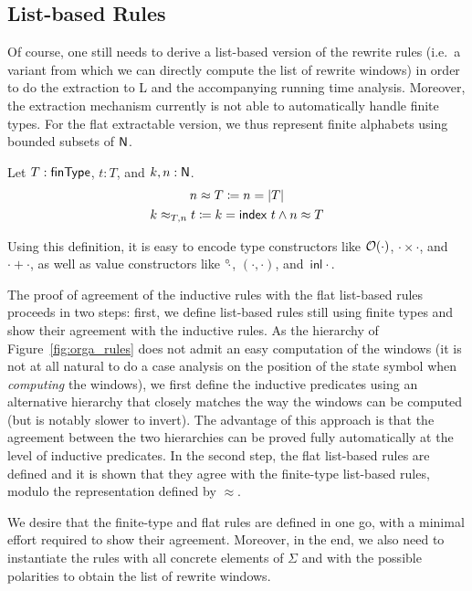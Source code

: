 \subsection{List-based Rules}
Of course, one still needs to derive a list-based version of the rewrite rules (i.e.\ a variant from which we can directly compute the list of rewrite windows) in order to do the extraction to L and the accompanying running time analysis. Moreover, the extraction mechanism currently is not able to automatically handle finite types. For the flat extractable version, we thus represent finite alphabets using bounded subsets of $\mathsf{N}$. 

\begin{definition}
  Let $T : \textsf{finType}$, $t : T$, and $k, n : \mathsf{N}$. 
  \begin{gather*}
    n \approx T \coloneqq n = |T| \\
    k \approx_{T, n} t \coloneqq k = \textsf{index}~t \land n \approx T
  \end{gather*}
\end{definition}

Using this definition, it is easy to encode type constructors like $\mathcal{O}{(\cdot)}$, $\cdot \times \cdot$, and $\cdot + \cdot$, as well as value constructors like $\degree\kern-0.5ex\cdot$, $( \cdot, \cdot)$, and $\textsf{inl}~\cdot$. 

The proof of agreement of the inductive rules with the flat list-based rules proceeds in two steps: first, we define list-based rules still using finite types and show their agreement with the inductive rules. As the hierarchy of Figure~\ref{fig:orga_rules} does not admit an easy computation of the windows (it is not at all natural to do a case analysis on the position of the state symbol when \emph{computing} the windows), we first define the inductive predicates using an alternative hierarchy that closely matches the way the windows can be computed (but is notably slower to invert). The advantage of this approach is that the agreement between the two hierarchies can be proved fully automatically at the level of inductive predicates.
In the second step, the flat list-based rules are defined and it is shown that they agree with the finite-type list-based rules, modulo the representation defined by $\approx$. 

We desire that the finite-type and flat rules are defined in one go, with a minimal effort required to show their agreement.
Moreover, in the end, we also need to instantiate the rules with all concrete elements of $\Sigma$ and with the possible polarities to obtain the list of rewrite windows. 

